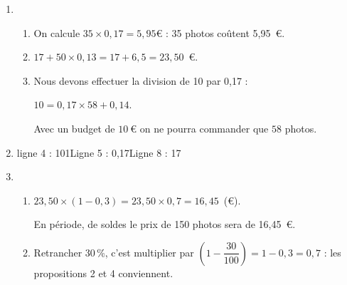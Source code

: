 
\medskip

\begin{enumerate}
\item 
	\begin{enumerate}
		\item On calcule $35 \times 0,17 = 5,95$\euro{} :  35 photos coûtent 5,95~\euro.
		\item $17 + 50 \times 0,13 = 17 + 6,5 = 23,50$~\euro.
		\item Nous devons effectuer la division de 10 par 0,17 :
		
$10 = 0,17 \times 58 + 0,14$.

Avec un budget de $10~\euro$ on ne pourra commander que $58$ photos.
	\end{enumerate}
\item ligne 4 : 101\quad  Ligne 5 : 0,17\quad  Ligne 8 : 17
\item 
	\begin{enumerate}
		\item $23,50 \times (1 - 0,3) = 23,50 \times 0,7 = 16,45$~(\euro).
		
En période, de soldes le prix de 150 photos sera de 16,45~\euro.
		\item Retrancher 30\,\%, c'est multiplier par $\left(1 - \dfrac{30}{100}\right) = 1 - 0,3 = 0,7$ : les propositions 2 et 4 conviennent.
	\end{enumerate}
\end{enumerate}

\medskip

